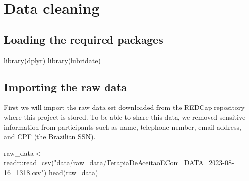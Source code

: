 \documentclass[
  letterpaper,
  DIV=11,
  numbers=noendperiod]{scrreprt}
\newenvironment{Shaded}{\begin{snugshade}}{\end{snugshade}}
\newcommand{\FunctionTok}[1]{\textcolor[rgb]{0.28,0.35,0.67}{#1}}
\newcommand{\NormalTok}[1]{\textcolor[rgb]{0.00,0.23,0.31}{#1}}
\newcommand{\OtherTok}[1]{\textcolor[rgb]{0.00,0.23,0.31}{#1}}
\newcommand{\SpecialCharTok}[1]{\textcolor[rgb]{0.37,0.37,0.37}{#1}}
\newcommand{\StringTok}[1]{\textcolor[rgb]{0.13,0.47,0.30}{#1}}
\begin{document}

\hypertarget{data-cleaning}{%
\chapter{Data cleaning}\label{data-cleaning}}

\hypertarget{loading-the-required-packages}{%
\section{Loading the required
packages}\label{loading-the-required-packages}}

\begin{Shaded}
\begin{Highlighting}[]
\FunctionTok{library}\NormalTok{(dplyr)}
\FunctionTok{library}\NormalTok{(lubridate)}
\end{Highlighting}
\end{Shaded}

\hypertarget{importing-the-raw-data}{%
\section{Importing the raw data}\label{importing-the-raw-data}}

First we will import the raw data set downloaded from the REDCap
repository where this project is stored. To be able to share this data,
we removed sensitive information from participants such as name,
telephone number, email address, and CPF (the Brazilian SSN).

\begin{Shaded}
\begin{Highlighting}[]
\NormalTok{raw\_data }\OtherTok{\textless{}{-}}\NormalTok{ readr}\SpecialCharTok{::}\FunctionTok{read\_csv}\NormalTok{(}\StringTok{"data/raw\_data/TerapiaDeAceitaoECom\_DATA\_2023{-}08{-}16\_1318.csv"}\NormalTok{)}
\FunctionTok{head}\NormalTok{(raw\_data)}
\end{Highlighting}
\end{Shaded}
\end{document}
